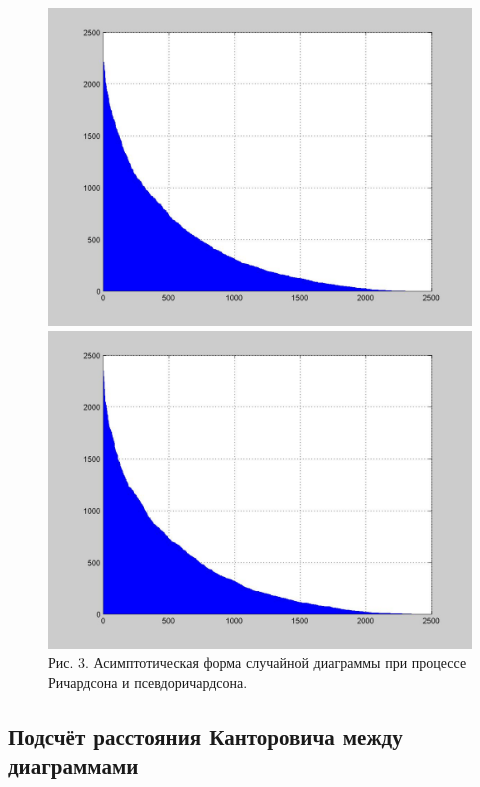 \documentclass[12pt]{report}
\begin{document}
\begin{figure}[!ht]
\begin{center}
\includegraphics[scale=0.2]{Richardson_assympt}
\includegraphics[scale=0.2]{Beta_assympt}
\\Рис. 3. Асимптотическая форма случайной диаграммы при процессе Ричардсона и псевдоричардсона.
\end{center}
\end{figure}

\newpage
\subsection*{Подсчёт расстояния Канторовича между диаграммами}
\end{document}
